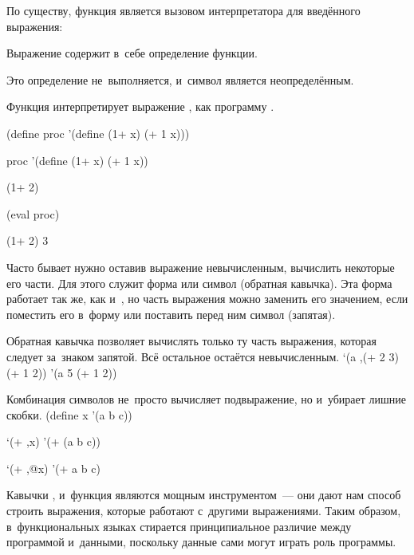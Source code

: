 По существу, функция  является вызовом интерпретатора \Scheme для введённого выражения:

\begin{example}{Выражение  содержит в~себе определение функции.

Это определение не~выполняется,  и~символ  является неопределённым.

Функция  интерпретирует  выражение , как программу \Scheme.}
\begin{ExampleCode}
(define proc
  '(define (1+ x)
       (+ 1 x)))
\end{ExampleCode}

\REPL
  {proc}
  {'(define (1+ x) (+ 1 x))}

\REPLin
  {(1+ 2)}


\REPLin
  {(eval proc)}

\REPL
  {(1+ 2)}
  {3}
\end{example}

Часто бывает нужно оставив выражение невычисленным, вычислить некоторые его части. Для этого служит форма  или символ  (обратная кавычка). Эта форма работает так же, как и~, но часть выражения можно заменить его значением, если поместить его в~форму  или поставить перед ним символ \s{,} (запятая).

\begin{example}{Обратная кавычка позволяет вычислять только ту часть выражения, которая следует за~знаком запятой. Всё остальное остаётся невычисленным.}
\REPL
  {`(a ,(+ 2 3) (+ 1 2))}
  {'(a 5 (+ 1 2))}
\end{example}

\begin{example}{Комбинация символов  не~просто вычисляет подвыражение, но и~убирает лишние скобки.
}
\REPLin
  {(define x '(a b c))}

\REPL
  {`(+ ,x)}
  {'(+ (a b c))}

\REPL
  {`(+ ,@x)}
  {'(+ a b c)}
\end{example}

Кавычки ,  и~функция  являются мощным инструментом~--- они дают нам способ строить выражения, которые работают с~другими выражениями. Таким образом, в~функциональных языках стирается принципиальное различие между программой и~данными, поскольку данные сами могут играть роль программы.

